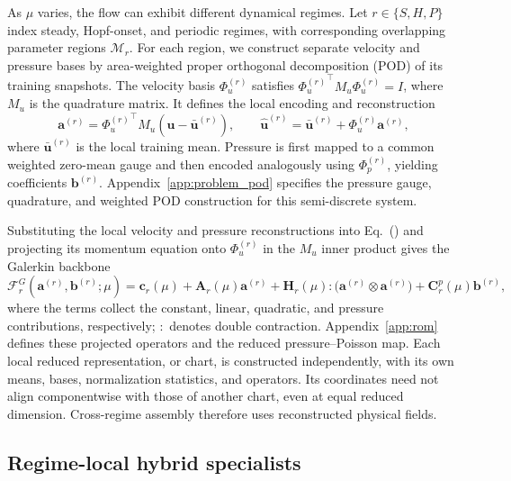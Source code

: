 As $\mu$ varies, the flow can exhibit different dynamical regimes.
Let $r\in\{S,H,P\}$ index steady, Hopf-onset, and periodic regimes,
with corresponding overlapping parameter regions $\mathcal M_r$.
For each region, we construct separate velocity and pressure bases by
area-weighted proper orthogonal decomposition (POD) of its training
snapshots. The velocity basis
$\Phi_u^{(r)}$ satisfies ${\Phi_u^{(r)}}^\top M_u\Phi_u^{(r)}=I$,
where $M_u$ is the quadrature matrix. It defines the local encoding
and reconstruction
\begin{equation}
  \bm a^{(r)}={\Phi_u^{(r)}}^{\top}M_u(\bm u-\bar{\bm u}^{(r)}),\qquad
  \widehat{\bm u}^{(r)}=\bar{\bm u}^{(r)}+\Phi_u^{(r)}\bm a^{(r)},
  \label{eq:main_chart}
\end{equation}
where $\bar{\bm u}^{(r)}$ is the local training mean. Pressure is first
mapped to a common weighted zero-mean gauge and then encoded analogously
using $\Phi_p^{(r)}$, yielding coefficients $\bm b^{(r)}$.
Appendix~\ref{app:problem_pod} specifies the pressure gauge, quadrature,
and weighted POD construction for this semi-discrete system.

Substituting the local velocity and pressure reconstructions into
Eq.~() and projecting its momentum
equation onto $\Phi_u^{(r)}$ in the $M_u$ inner product gives the
Galerkin backbone
\begin{equation}
  \mathcal F_r^{G}(\bm a^{(r)},\bm b^{(r)};\mu)
  =\bm c_r(\mu)+\bm A_r(\mu)\bm a^{(r)}
  +\bm H_r(\mu):\bigl(\bm a^{(r)}\otimes\bm a^{(r)}\bigr)
  +\bm C_r^p(\mu)\bm b^{(r)},
  \label{eq:main_galerkin_backbone}
\end{equation}
where the terms collect the constant, linear, quadratic, and pressure
contributions, respectively; $:$ denotes double contraction.
Appendix~\ref{app:rom} defines these projected operators and the
reduced pressure--Poisson map.
Each local reduced representation, or chart, is constructed independently,
with its own means, bases, normalization statistics, and operators.
Its coordinates need not align componentwise with those of another chart,
even at equal reduced dimension. Cross-regime assembly therefore uses
reconstructed physical fields.

\subsection{Regime-local hybrid specialists}

